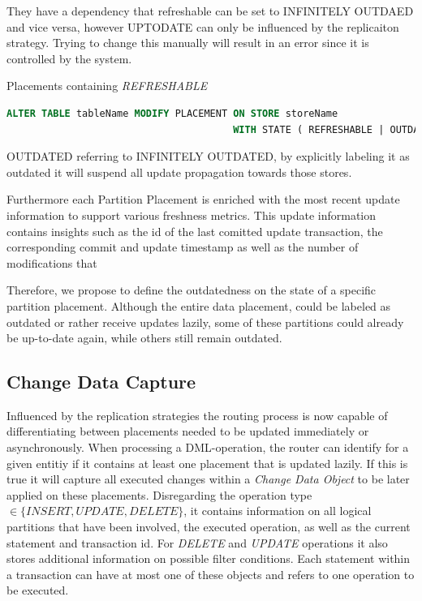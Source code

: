 They have a dependency that refreshable can be set to INFINITELY OUTDAED and vice versa, however UPTODATE can only be influenced by the replicaiton strategy.
Trying to change this manually will result in an error since it is controlled by the system.

Placements containing \emph{REFRESHABLE} 

\begin{lstlisting}[language=sql, caption={SQL Statement Syntax to change the designated Replication State of data placement.},label={lst:state}]
ALTER TABLE tableName MODIFY PLACEMENT ON STORE storeName 
                                       WITH STATE ( REFRESHABLE | OUTDATED );
\end{lstlisting}
OUTDATED referring to INFINITELY OUTDATED, by explicitly labeling it as outdated it will suspend all update propagation towards those stores.

Furthermore each Partition Placement is enriched with the most recent update information to support various freshness metrics.
This update information contains insights such as the id of the last comitted update transaction, the corresponding commit and update timestamp as well as the number of 
modifications that 


Therefore, we propose to define the outdatedness on the state of a specific partition placement.
Although the entire data placement, could be labeled as outdated or rather receive updates lazily, some of 
these partitions could already be up-to-date again, while others still remain outdated.



\subsection{Change Data Capture}
\label{sec:cdc_impl}

Influenced by the replication strategies the routing process is now capable of differentiating between placements needed to be updated immediately or asynchronously. 
When processing a DML-operation, the router can identify for a given entitiy if it contains at least one placement that is updated lazily.
If this is true it will capture all executed changes within a \emph{Change Data Object} to be later applied on these placements. 
Disregarding the operation type $\in \{INSERT,UPDATE,DELETE\}$, it contains information on all logical partitions that have been involved, 
the executed operation, as well as the current statement and transaction id. For \emph{DELETE} and \emph{UPDATE} operations it also stores additional information on possible filter 
conditions. Each statement within a transaction can have at most one of these objects and refers to one operation to be executed.\\

